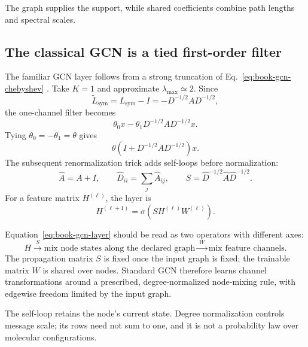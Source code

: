 The graph supplies the support, while shared coefficients combine path lengths and spectral
scales.

\subsection{The classical GCN is a tied first-order filter}

The familiar GCN layer follows from a strong truncation of
Eq.~\ref{eq:book-gcn-chebyshev} \cite{kipf2017}.  Take $K=1$ and approximate
$\lambda_{\max}\simeq2$.  Since
\begin{equation}
\widetilde L_{\mathrm{sym}}=L_{\mathrm{sym}}-I=-D^{-1/2}AD^{-1/2},
\end{equation}
the one-channel filter becomes
\begin{equation}
\theta_0x-\theta_1D^{-1/2}AD^{-1/2}x.
\end{equation}
Tying $\theta_0=-\theta_1=\theta$ gives
\begin{equation}
\theta\left(I+D^{-1/2}AD^{-1/2}\right)x.
\label{eq:book-gcn-first-order}
\end{equation}
The subsequent renormalization trick adds self-loops before normalization:
\begin{equation}
\widehat A=A+I,
\qquad
\widehat D_{ii}=\sum_j\widehat A_{ij},
\qquad
S=\widehat D^{-1/2}\widehat A\widehat D^{-1/2}.
\label{eq:book-gcn-renormalized-route}
\end{equation}
For a feature matrix $H^{(\ell)}$, the layer is
\begin{equation}
H^{(\ell+1)}
=\sigma\!\left(SH^{(\ell)}W^{(\ell)}\right).
\label{eq:book-gcn-layer}
\end{equation}

Equation~\ref{eq:book-gcn-layer} should be read as two operators with different axes:
\begin{equation}
H
\xrightarrow{\;S\;}
\text{mix node states along the declared graph}
\xrightarrow{\;W\;}
\text{mix feature channels}.
\label{eq:book-gcn-two-operators}
\end{equation}
The propagation matrix $S$ is fixed once the input graph is fixed; the trainable matrix $W$ is
shared over nodes.  Standard GCN therefore learns channel transformations around a prescribed,
degree-normalized node-mixing rule, with edgewise freedom limited by the input graph.

The self-loop retains the node's current state.  Degree normalization controls message scale;
its rows need not sum to one, and it is not a probability law over molecular configurations.


